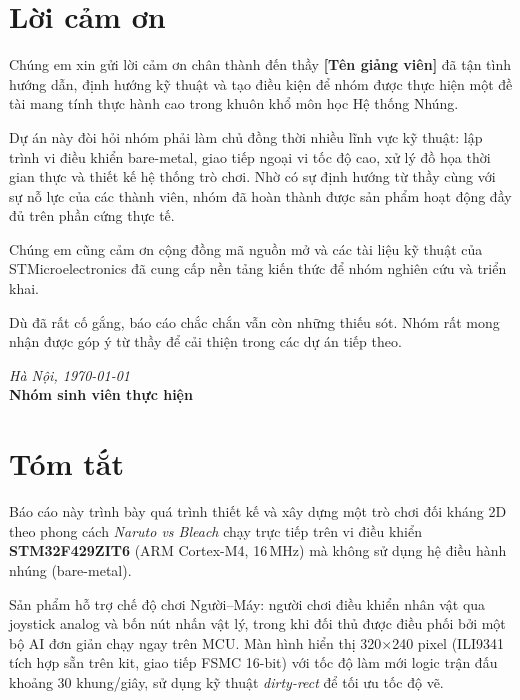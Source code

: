 \documentclass[a4paper,12pt]{report}
\begin{document}
\chapter*{Lời cảm ơn}

Chúng em xin gửi lời cảm ơn chân thành đến thầy \textbf{[Tên giảng viên]} đã tận tình hướng dẫn, định hướng kỹ thuật và tạo điều kiện để nhóm được thực hiện một đề tài mang tính thực hành cao trong khuôn khổ môn học Hệ thống Nhúng.

Dự án này đòi hỏi nhóm phải làm chủ đồng thời nhiều lĩnh vực kỹ thuật: lập trình vi điều khiển bare-metal, giao tiếp ngoại vi tốc độ cao, xử lý đồ họa thời gian thực và thiết kế hệ thống trò chơi. Nhờ có sự định hướng từ thầy cùng với sự nỗ lực của các thành viên, nhóm đã hoàn thành được sản phẩm hoạt động đầy đủ trên phần cứng thực tế.

Chúng em cũng cảm ơn cộng đồng mã nguồn mở và các tài liệu kỹ thuật của STMicroelectronics đã cung cấp nền tảng kiến thức để nhóm nghiên cứu và triển khai.

Dù đã rất cố gắng, báo cáo chắc chắn vẫn còn những thiếu sót. Nhóm rất mong nhận được góp ý từ thầy để cải thiện trong các dự án tiếp theo.

\vspace{1cm}
\begin{flushright}
    \textit{Hà Nội, \today} \\
    \textbf{Nhóm sinh viên thực hiện}
\end{flushright}
\newpage

\chapter*{Tóm tắt}

Báo cáo này trình bày quá trình thiết kế và xây dựng một trò chơi đối kháng 2D theo phong cách \textit{Naruto vs Bleach} chạy trực tiếp trên vi điều khiển \textbf{STM32F429ZIT6} (ARM Cortex-M4, 16\,MHz) mà không sử dụng hệ điều hành nhúng (bare-metal).

Sản phẩm hỗ trợ chế độ chơi Người--Máy: người chơi điều khiển nhân vật qua joystick analog và bốn nút nhấn vật lý, trong khi đối thủ được điều phối bởi một bộ AI đơn giản chạy ngay trên MCU. Màn hình hiển thị 320$\times$240 pixel (ILI9341 tích hợp sẵn trên kit, giao tiếp FSMC 16-bit) với tốc độ làm mới logic trận đấu khoảng 30 khung/giây, sử dụng kỹ thuật \textit{dirty-rect} để tối ưu tốc độ vẽ.
\end{document}

